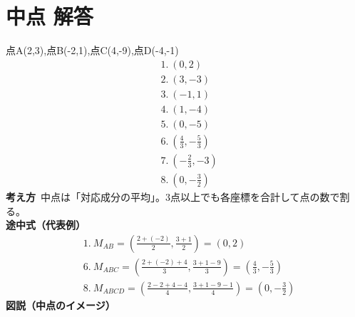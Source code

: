 \documentclass[paper=b4j,landscape,twocolumn,fleqn]{jlreq}
\begin{document}
\section{中点 解答}
点A(2,3),点B(-2,1),点C(4,-9),点D(-4,-1)
\begin{align*}
&1.\ (0,2)\\
&2.\ (3,-3)\\
&3.\ (-1,1)\\
&4.\ (1,-4)\\
&5.\ (0,-5)\\
&6.\ \left(\frac{4}{3},-\frac{5}{3}\right)\\
&7.\ \left(-\frac{2}{3},-3\right)\\
&8.\ \left(0,-\frac{3}{2}\right)
\end{align*}
\textbf{考え方}\
中点は「対応成分の平均」。3点以上でも各座標を合計して点の数で割る。\\
\textbf{途中式（代表例）}
\begin{align*}
&1.\ M_{AB}=\left(\frac{2+(-2)}{2},\frac{3+1}{2}\right)=(0,2)\\
&6.\ M_{ABC}=\left(\frac{2+(-2)+4}{3},\frac{3+1-9}{3}\right)=\left(\frac43,-\frac53\right)\\
&8.\ M_{ABCD}=\left(\frac{2-2+4-4}{4},\frac{3+1-9-1}{4}\right)=\left(0,-\frac32\right)
\end{align*}
\textbf{図説（中点のイメージ）}
\begin{center}
\end{center}

\newpage
\end{document}
